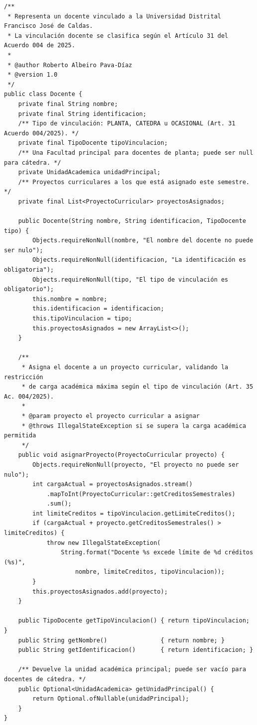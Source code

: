 \begin{lstlisting}[style=javaStyle,
  caption={Clase \texttt{Docente} corregida mediante aplicación del protocolo
    de revisión crítica. Se emplean tipos propios del dominio, validaciones
    normativas y documentación precisa referenciando el Acuerdo 004 de 2025.},
  label={lst:docente-corregido}]
/**
 * Representa un docente vinculado a la Universidad Distrital Francisco José de Caldas.
 * La vinculación docente se clasifica según el Artículo 31 del Acuerdo 004 de 2025.
 *
 * @author Roberto Albeiro Pava-Díaz
 * @version 1.0
 */
public class Docente {
    private final String nombre;
    private final String identificacion;
    /** Tipo de vinculación: PLANTA, CATEDRA u OCASIONAL (Art. 31 Acuerdo 004/2025). */
    private final TipoDocente tipoVinculacion;
    /** Una Facultad principal para docentes de planta; puede ser null para cátedra. */
    private UnidadAcademica unidadPrincipal;
    /** Proyectos curriculares a los que está asignado este semestre. */
    private final List<ProyectoCurricular> proyectosAsignados;

    public Docente(String nombre, String identificacion, TipoDocente tipo) {
        Objects.requireNonNull(nombre, "El nombre del docente no puede ser nulo");
        Objects.requireNonNull(identificacion, "La identificación es obligatoria");
        Objects.requireNonNull(tipo, "El tipo de vinculación es obligatorio");
        this.nombre = nombre;
        this.identificacion = identificacion;
        this.tipoVinculacion = tipo;
        this.proyectosAsignados = new ArrayList<>();
    }

    /**
     * Asigna el docente a un proyecto curricular, validando la restricción
     * de carga académica máxima según el tipo de vinculación (Art. 35 Ac. 004/2025).
     *
     * @param proyecto el proyecto curricular a asignar
     * @throws IllegalStateException si se supera la carga académica permitida
     */
    public void asignarProyecto(ProyectoCurricular proyecto) {
        Objects.requireNonNull(proyecto, "El proyecto no puede ser nulo");
        int cargaActual = proyectosAsignados.stream()
            .mapToInt(ProyectoCurricular::getCreditosSemestrales)
            .sum();
        int limiteCreditos = tipoVinculacion.getLimiteCreditos();
        if (cargaActual + proyecto.getCreditosSemestrales() > limiteCreditos) {
            throw new IllegalStateException(
                String.format("Docente %s excede límite de %d créditos (%s)",
                    nombre, limiteCreditos, tipoVinculacion));
        }
        this.proyectosAsignados.add(proyecto);
    }

    public TipoDocente getTipoVinculacion() { return tipoVinculacion; }
    public String getNombre()               { return nombre; }
    public String getIdentificacion()       { return identificacion; }

    /** Devuelve la unidad académica principal; puede ser vacío para docentes de cátedra. */
    public Optional<UnidadAcademica> getUnidadPrincipal() {
        return Optional.ofNullable(unidadPrincipal);
    }
}
\end{lstlisting}

